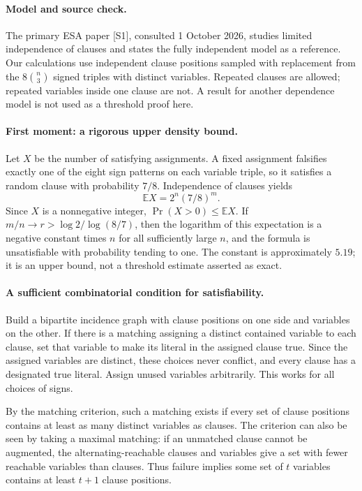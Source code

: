 \documentclass[11pt]{article}
\begin{document}
\paragraph{Model and source check.}
The primary ESA paper [S1], consulted 1 October 2026, studies limited independence of clauses and states the fully independent model as a reference. Our calculations use independent clause positions sampled with replacement from the $8\binom n3$ signed triples with distinct variables. Repeated clauses are allowed; repeated variables inside one clause are not. A result for another dependence model is not used as a threshold proof here.

\paragraph{First moment: a rigorous upper density bound.}
Let $X$ be the number of satisfying assignments. A fixed assignment falsifies exactly one of the eight sign patterns on each variable triple, so it satisfies a random clause with probability $7/8$. Independence of clauses yields
\[
\mathbb E X=2^n(7/8)^m.
\]
Since $X$ is a nonnegative integer, $\Pr(X>0)\le\mathbb E X$. If $m/n\to r>\log2/\log(8/7)$, then the logarithm of this expectation is a negative constant times $n$ for all sufficiently large $n$, and the formula is unsatisfiable with probability tending to one. The constant is approximately $5.19$; it is an upper bound, not a threshold estimate asserted as exact.

\paragraph{A sufficient combinatorial condition for satisfiability.}
Build a bipartite incidence graph with clause positions on one side and variables on the other. If there is a matching assigning a distinct contained variable to each clause, set that variable to make its literal in the assigned clause true. Since the assigned variables are distinct, these choices never conflict, and every clause has a designated true literal. Assign unused variables arbitrarily. This works for all choices of signs.

By the matching criterion, such a matching exists if every set of clause positions contains at least as many distinct variables as clauses. The criterion can also be seen by taking a maximal matching: if an unmatched clause cannot be augmented, the alternating-reachable clauses and variables give a set with fewer reachable variables than clauses. Thus failure implies some set of $t$ variables contains at least $t+1$ clause positions.
\end{document}
